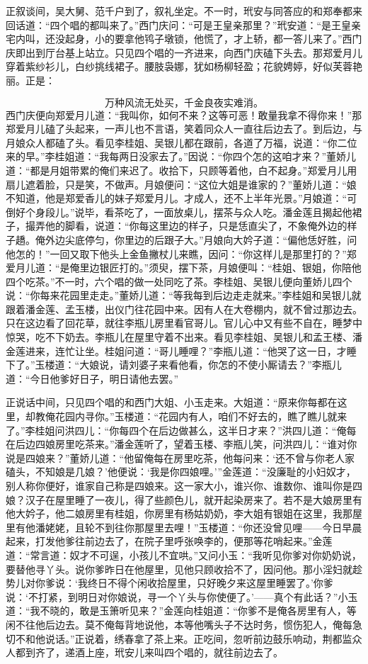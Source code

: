 正叙谈间，吴大舅、范千户到了，叙礼坐定。不一时，玳安与同答应的和郑奉都来回话道：“四个唱的都叫来了。”西门庆问：“可是王皇亲那里？”玳安道：“是王皇亲宅内叫，还没起身，小的要拿他鸨子墩锁，他慌了，才上轿，都一答儿来了。”西门庆即出到厅台基上站立。只见四个唱的一齐进来，向西门庆磕下头去。那郑爱月儿穿着紫纱衫儿，白纱挑线裙子。腰肢袅娜，犹如杨柳轻盈；花貌娉婷，好似芙蓉艳丽。正是：

\[
万种风流无处买，千金良夜实难消。
\]
西门庆便向郑爱月儿道：“我叫你，如何不来？这等可恶！敢量我拿不得你来！”那郑爱月儿磕了头起来，一声儿也不言语，笑着同众人一直往后边去了。到后边，与月娘众人都磕了头。看见李桂姐、吴银儿都在跟前，各道了万福，说道：“你二位来的早。”李桂姐道：“我每两日没家去了。”因说：“你四个怎的这咱才来？”董娇儿道：“都是月姐带累的俺们来迟了。收拾下，只顾等着他，白不起身。”郑爱月儿用扇儿遮着脸，只是笑，不做声。月娘便问：“这位大姐是谁家的？”董娇儿道：“娘不知道，他是郑爱香儿的妹子郑爱月儿。才成人，还不上半年光景。”月娘道：“可倒好个身段儿。”说毕，看茶吃了，一面放桌儿，摆茶与众人吃。潘金莲且揭起他裙子，撮弄他的脚看，说道：“你每这里边的样子，只是恁直尖了，不象俺外边的样子趫。俺外边尖底停匀，你里边的后跟子大。”月娘向大妗子道：“偏他恁好胜，问他怎的！”一回又取下他头上金鱼撇杖儿来瞧，因问：“你这样儿是那里打的？”郑爱月儿道：“是俺里边银匠打的。”须臾，摆下茶，月娘便叫：“桂姐、银姐，你陪他四个吃茶。”不一时，六个唱的做一处同吃了茶。李桂姐、吴银儿便向董娇儿四个说：“你每来花园里走走。”董娇儿道：“等我每到后边走走就来。”李桂姐和吴银儿就跟着潘金莲、孟玉楼，出仪门往花园中来。因有人在大卷棚内，就不曾过那边去。只在这边看了回花草，就往李瓶儿房里看官哥儿。官儿心中又有些不自在，睡梦中惊哭，吃不下奶去。李瓶儿在屋里守着不出来。看见李桂姐、吴银儿和孟王楼、潘金莲进来，连忙让坐。桂姐问道：“哥儿睡哩？”李瓶儿道：“他哭了这一日，才睡下了。”玉楼道：“大娘说，请刘婆子来看他看，你怎的不使小厮请去？”李瓶儿道：“今日他爹好日子，明日请他去罢。”

正说话中间，只见四个唱的和西门大姐、小玉走来。大姐道：“原来你每都在这里，却教俺花园内寻你。”玉楼道：“花园内有人，咱们不好去的，瞧了瞧儿就来了。”李桂姐问洪四儿：“你每四个在后边做甚么，这半日才来？”洪四儿道：“俺每在后边四娘房里吃茶来。”潘金莲听了，望着玉楼、李瓶儿笑，问洪四儿：“谁对你说是四娘来？”董娇儿道：“他留俺每在房里吃茶，他每问来：‘还不曾与你老人家磕头，不知娘是几娘？’他便说：‘我是你四娘哩。’”金莲道：“没廉耻的小妇奴才，别人称你便好，谁家自己称是四娘来。这一家大小，谁兴你、谁数你、谁叫你是四娘？汉子在屋里睡了一夜儿，得了些颜色儿，就开起染房来了。若不是大娘房里有他大妗子，他二娘房里有桂姐，你房里有杨姑奶奶，李大姐有银姐在这里，我那屋里有他潘姥姥，且轮不到往你那屋里去哩！”玉楼道：“你还没曾见哩——今日早晨起来，打发他爹往前边去了，在院子里呼张唤李的，便那等花哨起来。”金莲道：“常言道：奴才不可逞，小孩儿不宜哄。”又问小玉：“我听见你爹对你奶奶说，要替他寻丫头。说你爹昨日在他屋里，见他只顾收拾不了，因问他。那小淫妇就趁势儿对你爹说：‘我终日不得个闲收拾屋里，只好晚夕来这屋里睡罢了。’你爹说：‘不打紧，到明日对你娘说，寻一个丫头与你使便了。’——真个有此话？”小玉道：“我不晓的，敢是玉箫听见来？”金莲向桂姐道：“你爹不是俺各房里有人，等闲不往他后边去。莫不俺每背地说他，本等他嘴头子不达时务，惯伤犯人，俺每急切不和他说话。”正说着，绣春拿了茶上来。正吃间，忽听前边鼓乐响动，荆都监众人都到齐了，递酒上座，玳安儿来叫四个唱的，就往前边去了。

